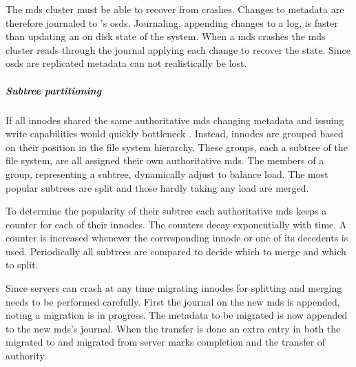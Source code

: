 The \ac{mds} cluster must be able to recover from crashes. Changes to metadata are therefore journaled to \ceph{}'s \acfp{osd}. Journaling, appending changes to a log, is faster than updating an on disk state of the system. When a \ac{mds} crashes the \ac{mds} cluster reads through the journal applying each change to recover the state. Since \acp{osd} are replicated metadata can not realistically be lost.
%
\subparagraph{Subtree partitioning} \label{sec:subtree}
If all innodes shared the same authoritative \ac{mds} changing metadata and issuing write capabilities would quickly bottleneck \ceph{}. Instead, innodes are grouped based on their position in the file system hierarchy. These groups, each a subtree of the file system, are all assigned their own authoritative \ac{mds}. The members of a group, representing a subtree, dynamically adjust to balance load. The most popular subtrees are split and those hardly taking any load are merged.

To determine the popularity of their subtree each authoritative \ac{mds} keeps a counter for each of their innodes. The counters decay exponentially with time. A counter is increased whenever the corresponding innode or one of its decedents is used. Periodically all subtrees are compared to decide which to merge and which to split.

Since servers can crash at any time migrating innodes for splitting and merging needs to be performed carefully. First the journal on the new \ac{mds} is appended, noting a migration is in progress. The metadata to be migrated is now appended to the new \ac{mds}'s journal. When the transfer is done an extra entry in both the migrated to and migrated from server marks completion and the transfer of authority. 
